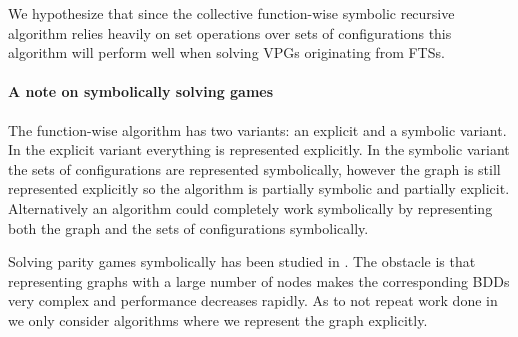 We hypothesize that since the collective function-wise symbolic recursive algorithm relies heavily on set operations over sets of configurations this algorithm will perform well when solving VPGs originating from FTSs.

\paragraph{A note on symbolically solving games}
The function-wise algorithm has two variants: an explicit and a symbolic variant. In the explicit variant everything is represented explicitly. In the symbolic variant the sets of configurations are represented symbolically, however the graph is still represented explicitly so the algorithm is partially symbolic and partially explicit. Alternatively an algorithm could completely work symbolically by representing both the graph and the sets of configurations symbolically.

Solving parity games symbolically has been studied in \cite{BDDSolvingPG}. The obstacle is that representing graphs with a large number of nodes makes the corresponding BDDs very complex and performance decreases rapidly. As to not repeat work done in \cite{BDDSolvingPG} we only consider algorithms where we represent the graph explicitly. 

